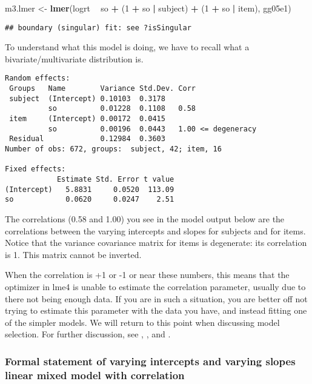 \documentclass[12pt,]{krantz}
\newenvironment{Shaded}{\begin{snugshade}}{\end{snugshade}}
\newcommand{\DecValTok}[1]{\textcolor[rgb]{0.00,0.00,0.81}{#1}}
\newcommand{\KeywordTok}[1]{\textcolor[rgb]{0.13,0.29,0.53}{\textbf{#1}}}
\newcommand{\NormalTok}[1]{#1}
\newcommand{\OperatorTok}[1]{\textcolor[rgb]{0.81,0.36,0.00}{\textbf{#1}}}
\newcommand{\StringTok}[1]{\textcolor[rgb]{0.31,0.60,0.02}{#1}}
\begin{document}
\begin{Shaded}
\begin{Highlighting}[]
\NormalTok{m3.lmer <-}\StringTok{ }\KeywordTok{lmer}\NormalTok{(logrt }\OperatorTok{~}\StringTok{ }\NormalTok{so }\OperatorTok{+}\StringTok{ }\NormalTok{(}\DecValTok{1} \OperatorTok{+}\StringTok{ }\NormalTok{so }\OperatorTok{|}\StringTok{ }\NormalTok{subject) }\OperatorTok{+}\StringTok{ }
\StringTok{  }\NormalTok{(}\DecValTok{1} \OperatorTok{+}\StringTok{ }\NormalTok{so }\OperatorTok{|}\StringTok{ }\NormalTok{item), gg05e1)}
\end{Highlighting}
\end{Shaded}

\begin{verbatim}
## boundary (singular) fit: see ?isSingular
\end{verbatim}

To understand what this model is doing, we have to recall what a bivariate/multivariate distribution is.

\begin{verbatim}
Random effects:
 Groups   Name        Variance Std.Dev. Corr
 subject  (Intercept) 0.10103  0.3178       
          so          0.01228  0.1108   0.58
 item     (Intercept) 0.00172  0.0415       
          so          0.00196  0.0443   1.00 <= degeneracy
 Residual             0.12984  0.3603       
Number of obs: 672, groups:  subject, 42; item, 16

Fixed effects:
            Estimate Std. Error t value
(Intercept)   5.8831     0.0520  113.09
so            0.0620     0.0247    2.51
\end{verbatim}

The correlations (0.58 and 1.00) you see in the model output below are the correlations between the varying intercepts and slopes for subjects and for items. Notice that the variance covariance matrix for items is degenerate: its correlation is 1. This matrix cannot be inverted.

When the correlation is +1 or -1 or near these numbers, this means that the optimizer in lme4 is unable to estimate the correlation parameter, usually due to there not being enough data. If you are in such a situation, you are better off not trying to estimate this parameter with the data you have, and instead fitting one of the simpler models. We will return to this point when discussing model selection. For further discussion, see \citet{barr2013}, \citet{BatesEtAlParsimonious}, and \citet{hannesBEAP}.

\hypertarget{formal-statement-of-varying-intercepts-and-varying-slopes-linear-mixed-model-with-correlation}{%
\subsubsection{Formal statement of varying intercepts and varying slopes linear mixed model with correlation}\label{formal-statement-of-varying-intercepts-and-varying-slopes-linear-mixed-model-with-correlation}}
\end{document}
